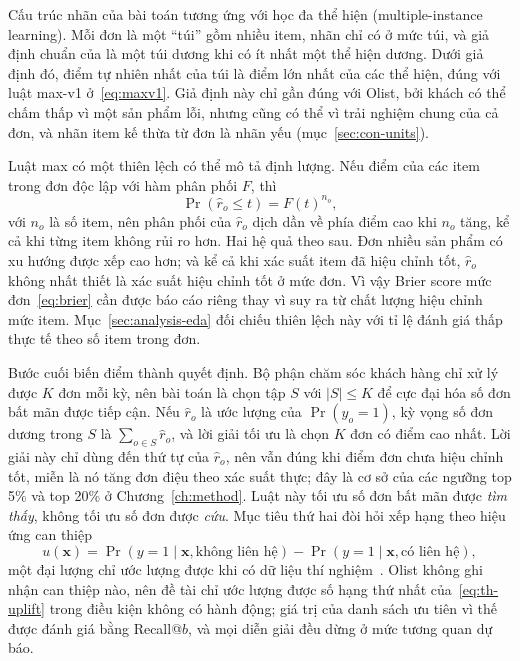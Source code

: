 \documentclass[12pt,a4paper]{report}
\begin{document}
Cấu trúc nhãn của bài toán tương ứng với học đa thể hiện (multiple-instance learning). Mỗi đơn là một ``túi'' gồm nhiều item, nhãn chỉ có ở mức túi, và giả định chuẩn của \textcite{dietterich1997} là một túi dương khi có ít nhất một thể hiện dương. Dưới giả định đó, điểm tự nhiên nhất của túi là điểm lớn nhất của các thể hiện, đúng với luật max-v1 ở~\eqref{eq:maxv1}. Giả định này chỉ gần đúng với Olist, bởi khách có thể chấm thấp vì một sản phẩm lỗi, nhưng cũng có thể vì trải nghiệm chung của cả đơn, và nhãn item kế thừa từ đơn là nhãn yếu (mục~\ref{sec:con-units}).

Luật max có một thiên lệch có thể mô tả định lượng. Nếu điểm của các item trong đơn độc lập với hàm phân phối $F$, thì
\begin{equation}\label{eq:th-maxbias}
  \Pr\left( \hat{r}_o \le t \right) = F(t)^{n_o},
\end{equation}
với $n_o$ là số item, nên phân phối của $\hat r_o$ dịch dần về phía điểm cao khi $n_o$ tăng, kể cả khi từng item không rủi ro hơn. Hai hệ quả theo sau. Đơn nhiều sản phẩm có xu hướng được xếp cao hơn; và kể cả khi xác suất item đã hiệu chỉnh tốt, $\hat r_o$ không nhất thiết là xác suất hiệu chỉnh tốt ở mức đơn. Vì vậy Brier score mức đơn~\eqref{eq:brier} cần được báo cáo riêng thay vì suy ra từ chất lượng hiệu chỉnh mức item. Mục~\ref{sec:analysis-eda} đối chiếu thiên lệch này với tỉ lệ đánh giá thấp thực tế theo số item trong đơn.

Bước cuối biến điểm thành quyết định. Bộ phận chăm sóc khách hàng chỉ xử lý được $K$ đơn mỗi kỳ, nên bài toán là chọn tập $S$ với $|S| \le K$ để cực đại hóa số đơn bất mãn được tiếp cận. Nếu $\hat r_o$ là ước lượng của $\Pr(y_o = 1)$, kỳ vọng số đơn dương trong $S$ là $\sum_{o \in S} \hat r_o$, và lời giải tối ưu là chọn $K$ đơn có điểm cao nhất. Lời giải này chỉ dùng đến thứ tự của $\hat r_o$, nên vẫn đúng khi điểm đơn chưa hiệu chỉnh tốt, miễn là nó tăng đơn điệu theo xác suất thực; đây là cơ sở của các ngưỡng top 5\% và top 20\% ở Chương~\ref{ch:method}. Luật này tối ưu số đơn bất mãn được \emph{tìm thấy}, không tối ưu số đơn được \emph{cứu}. Mục tiêu thứ hai đòi hỏi xếp hạng theo hiệu ứng can thiệp
\begin{equation}\label{eq:th-uplift}
  u(\mathbf{x}) = \Pr\left( y = 1 \mid \mathbf{x}, \text{không liên hệ} \right) - \Pr\left( y = 1 \mid \mathbf{x}, \text{có liên hệ} \right),
\end{equation}
một đại lượng chỉ ước lượng được khi có dữ liệu thí nghiệm~\parencite{ascarza2018,devriendt2021}. Olist không ghi nhận can thiệp nào, nên đề tài chỉ ước lượng được số hạng thứ nhất của~\eqref{eq:th-uplift} trong điều kiện không có hành động; giá trị của danh sách ưu tiên vì thế được đánh giá bằng Recall@$b$, và mọi diễn giải đều dừng ở mức tương quan dự báo.
 
\end{document}
